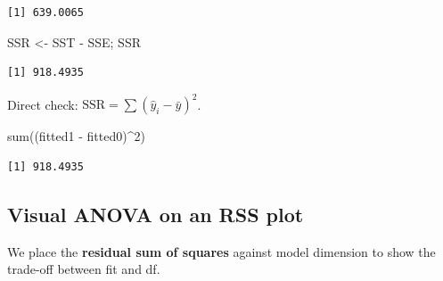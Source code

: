 \documentclass[
  letterpaper,
]{scrbook}
\newenvironment{Shaded}{\begin{snugshade}}{\end{snugshade}}
\newcommand{\DecValTok}[1]{\textcolor[rgb]{0.68,0.00,0.00}{#1}}
\newcommand{\FunctionTok}[1]{\textcolor[rgb]{0.28,0.35,0.67}{#1}}
\newcommand{\NormalTok}[1]{\textcolor[rgb]{0.00,0.23,0.31}{#1}}
\newcommand{\OtherTok}[1]{\textcolor[rgb]{0.00,0.23,0.31}{#1}}
\newcommand{\SpecialCharTok}[1]{\textcolor[rgb]{0.37,0.37,0.37}{#1}}
\begin{document}
\begin{verbatim}
[1] 639.0065
\end{verbatim}

\begin{Shaded}
\begin{Highlighting}[]
\NormalTok{SSR }\OtherTok{\textless{}{-}}\NormalTok{ SST }\SpecialCharTok{{-}}\NormalTok{ SSE; SSR}
\end{Highlighting}
\end{Shaded}

\begin{verbatim}
[1] 918.4935
\end{verbatim}

Direct check: \(\text{SSR}=\sum(\hat y_i-\bar y)^2\).

\begin{Shaded}
\begin{Highlighting}[]
\FunctionTok{sum}\NormalTok{((fitted1 }\SpecialCharTok{{-}}\NormalTok{ fitted0)}\SpecialCharTok{\^{}}\DecValTok{2}\NormalTok{)}
\end{Highlighting}
\end{Shaded}

\begin{verbatim}
[1] 918.4935
\end{verbatim}

\subsection{Visual ANOVA on an RSS
plot}\label{visual-anova-on-an-rss-plot}

We place the \textbf{residual sum of squares} against model dimension to
show the trade-off between fit and df.
\end{document}
